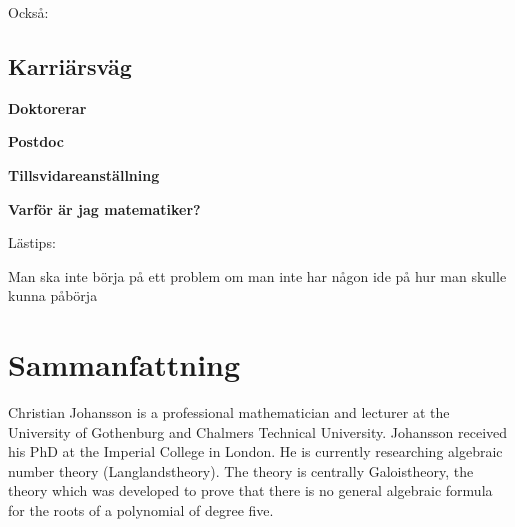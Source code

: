 Också:

\section{Karriärsväg}
\textbf{Doktorerar}

\textbf{Postdoc}

\textbf{Tillsvidareanställning}


\textbf{Varför är jag matematiker?}

Lästips:

Man ska inte börja på ett problem om man inte har någon ide på hur man skulle kunna påbörja

\chapter{Sammanfattning}
Christian Johansson is a professional mathematician and lecturer at the University of Gothenburg and Chalmers Technical University. Johansson received his PhD at the Imperial College in London. He is currently researching algebraic number theory (Langlandstheory).
The theory is centrally Galoistheory, the theory which was developed to prove that there is no general algebraic formula for the roots of a polynomial of degree five.\\\\

